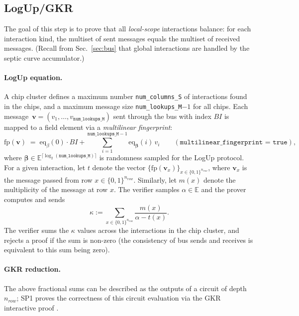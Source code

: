 \documentclass[11pt]{article}
\begin{document}
\subsection{LogUp/GKR}\label{sec:logup-gkr}

The goal of this step is to prove that all \emph{local-scope} interactions
balance: for each interaction kind, the multiset of sent messages equals
the multiset of received messages.
(Recall from Sec.~\ref{sec:bus} that
global interactions are handled by the septic curve accumulator.)

\paragraph{LogUp equation.}
A chip cluster defines a maximum number \texttt{num\_columns\_S} of interactions found in the chips,
and a maximum message size \texttt{num\_lookups\_M}$-1$ for all chips.
Each message~$\mathbf{v} = (v_1,\ldots, v_{\texttt{num\_lookups\_M}})$ sent through the bus with index $BI$ is mapped to a field element via a \emph{multilinear fingerprint}:
\[
  \mathrm{fp}(\mathbf{v}) \;=\; \mathrm{eq}_{\beta}(0)\cdot BI + \sum_{i=1}^{\texttt{num\_lookups\_M}-1} \mathrm{eq}_{\mathbf{\beta}}(i)\, v_i
  \qquad (\texttt{multilinear\_fingerprint = true}),
\]
where $\mathbf{\beta}\in \mathbb{E}^{\lceil{\log_2(\texttt{num\_lookups\_M})}\rceil}$ is randomness
sampled for the LogUp protocol.
For a given interaction, let $t$ denote the vector $\{\mathrm{fp}(\mathbf{v}_x)\}_{x\in \{0,1\}^{n_{row}}}$, where $\mathbf{v}_x$ is the message
passed from row $x\in \{0,1\}^{n_{row}}$.
Similarly, let $m(x)$ denote the multiplicity of the message at row $x$.
The verifier samples $\alpha\in \mathbb{E}$ and the prover computes and sends
\begin{equation}\label{eq:logup}
  \kappa:= \sum_{x\in\{0,1\}^{n_{row}}} \frac{m(x)}{\alpha - t(x)}.
\end{equation}
The verifier sums the $\kappa$ values across the interactions in the chip cluster, and rejects a proof
if the sum is non-zero (the consistency of bus sends and receives is equivalent to this sum being zero).

\paragraph{GKR reduction.} The above fractional sums can be described as the outputs of a circuit of
depth $n_{row}$; SP1 proves the correctness of this circuit evaluation via the GKR interactive proof \cite{DBLP:journals/iacr/PapiniH23}.
\end{document}
